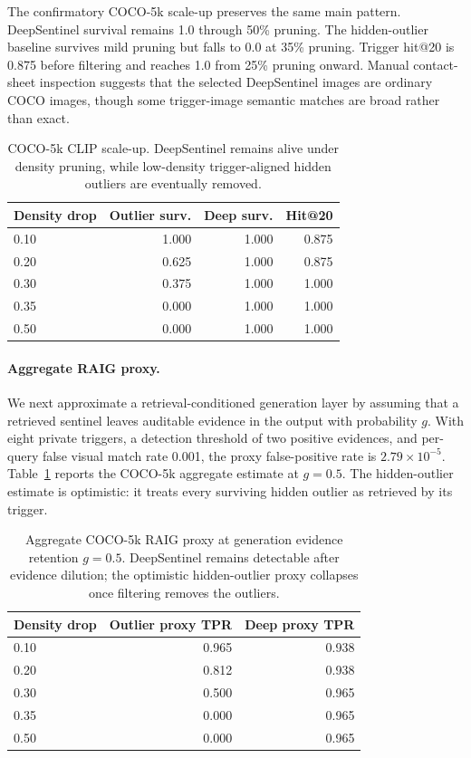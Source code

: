 \documentclass[letterpaper]{article}
\begin{document}
The confirmatory COCO-5k scale-up preserves the same main pattern. DeepSentinel
survival remains 1.0 through 50\% pruning. The hidden-outlier baseline survives
mild pruning but falls to 0.0 at 35\% pruning. Trigger hit@20 is 0.875 before
filtering and reaches 1.0 from 25\% pruning onward. Manual contact-sheet
inspection suggests that the selected DeepSentinel images are ordinary COCO
images, though some trigger-image semantic matches are broad rather than exact.

\begin{table}[t]
\centering
\small
\begin{tabular}{lrrr}
\toprule
Density drop & Outlier surv. & Deep surv. & Hit@20 \\
\midrule
0.10 & 1.000 & 1.000 & 0.875 \\
0.20 & 0.625 & 1.000 & 0.875 \\
0.30 & 0.375 & 1.000 & 1.000 \\
0.35 & 0.000 & 1.000 & 1.000 \\
0.50 & 0.000 & 1.000 & 1.000 \\
\bottomrule
\end{tabular}
\caption{COCO-5k CLIP scale-up. DeepSentinel remains alive under density
pruning, while low-density trigger-aligned hidden outliers are eventually
removed.}
\end{table}

\paragraph{Aggregate RAIG proxy.}
We next approximate a retrieval-conditioned generation layer by assuming that a
retrieved sentinel leaves auditable evidence in the output with probability
$g$. With eight private triggers, a detection threshold of two positive
evidences, and per-query false visual match rate 0.001, the proxy false-positive
rate is $2.79\times 10^{-5}$. Table~\ref{tab:raig-proxy} reports the
COCO-5k aggregate estimate at $g=0.5$. The hidden-outlier estimate is optimistic:
it treats every surviving hidden outlier as retrieved by its trigger.

\begin{table}[t]
\centering
\small
\begin{tabular}{lrr}
\toprule
Density drop & Outlier proxy TPR & Deep proxy TPR \\
\midrule
0.10 & 0.965 & 0.938 \\
0.20 & 0.812 & 0.938 \\
0.30 & 0.500 & 0.965 \\
0.35 & 0.000 & 0.965 \\
0.50 & 0.000 & 0.965 \\
\bottomrule
\end{tabular}
\caption{Aggregate COCO-5k RAIG proxy at generation evidence retention
$g=0.5$. DeepSentinel remains detectable after evidence dilution; the optimistic
hidden-outlier proxy collapses once filtering removes the outliers.}
\label{tab:raig-proxy}
\end{table}
\end{document}

